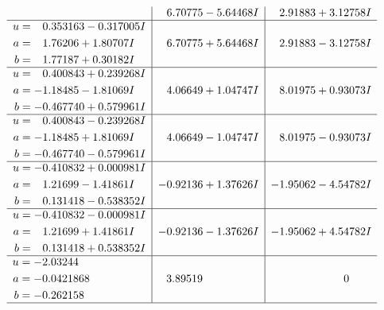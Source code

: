 \documentclass[1p]{elsarticle_modified}
\theoremstyle{definition}
\begin{document}
$$\begin{array}{c|c|c}
 & \phantom{-}6.70775 - 5.64468 I & \phantom{-}2.91883 + 3.12758 I \\ \hline\begin{aligned}
u &= \phantom{-}0.353163 - 0.317005 I \\
a &= \phantom{-}1.76206 + 1.80707 I \\
b &= \phantom{-}1.77187 + 0.30182 I\end{aligned}
 & \phantom{-}6.70775 + 5.64468 I & \phantom{-}2.91883 - 3.12758 I \\ \hline\begin{aligned}
u &= \phantom{-}0.400843 + 0.239268 I \\
a &= -1.18485 - 1.81069 I \\
b &= -0.467740 + 0.579961 I\end{aligned}
 & \phantom{-}4.06649 + 1.04747 I & \phantom{-}8.01975 + 0.93073 I \\ \hline\begin{aligned}
u &= \phantom{-}0.400843 - 0.239268 I \\
a &= -1.18485 + 1.81069 I \\
b &= -0.467740 - 0.579961 I\end{aligned}
 & \phantom{-}4.06649 - 1.04747 I & \phantom{-}8.01975 - 0.93073 I \\ \hline\begin{aligned}
u &= -0.410832 + 0.000981 I \\
a &= \phantom{-}1.21699 - 1.41861 I \\
b &= \phantom{-}0.131418 - 0.538352 I\end{aligned}
 & -0.92136 + 1.37626 I & -1.95062 - 4.54782 I \\ \hline\begin{aligned}
u &= -0.410832 - 0.000981 I \\
a &= \phantom{-}1.21699 + 1.41861 I \\
b &= \phantom{-}0.131418 + 0.538352 I\end{aligned}
 & -0.92136 - 1.37626 I & -1.95062 + 4.54782 I \\ \hline\begin{aligned}
u &= -2.03244\phantom{ +0.000000I} \\
a &= -0.0421868\phantom{ +0.000000I} \\
b &= -0.262158\phantom{ +0.000000I}\end{aligned}
 & \phantom{-}3.89519\phantom{ +0.000000I} & \phantom{-0.000000 } 0\\
 \hline 
 \end{array}$$\newpage\newpage\renewcommand{\arraystretch}{1}
\end{document}
